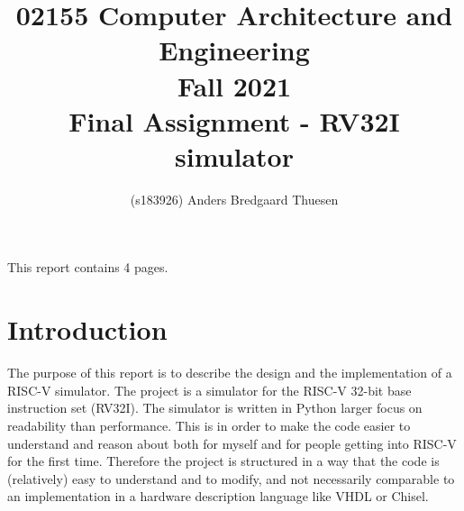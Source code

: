 \documentclass{article}
\title{02155 Computer Architecture and Engineering \\ Fall 2021 \\ Final Assignment - RV32I simulator}
\author{(s183926) Anders Bredgaard Thuesen}
\begin{document}
\maketitle
This report contains 4 pages.
\newpage
\section{Introduction}
The purpose of this report is to describe the design and the implementation of a RISC-V simulator. 
The project is a simulator for the RISC-V 32-bit base instruction set (RV32I). The simulator is written in Python larger focus on readability than performance. This is in order to make the code easier to understand and reason about both for myself and for people getting into RISC-V for the first time. Therefore the project is structured in a way that the code is (relatively) easy to understand and to modify, and not necessarily comparable to an implementation in a hardware description language like VHDL or Chisel. 
\end{document}
